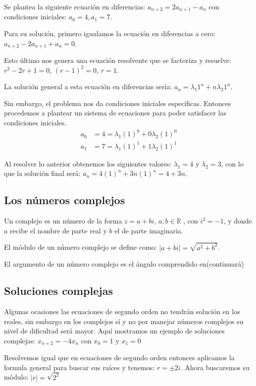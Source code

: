 \documentclass{article}
\begin{document}
Se plantea la siguiente ecuación en diferencias:
$a_{n+2}=2a_{n+1}-a_{n}$ con condiciones iniciales: $a_{0}=4, a_{1}=7$.

Para su solución, primero igualamos la ecuación en diferencias a
cero: $a_{n+2}-2a_{n+1}+a_{n}=0$.

Esto último nos genera una ecuación resolvente que se factoriza y
resuelve: $r^2-2r+1=0$, ${(r-1)^2=0}$, ${r=1}$.

La solución general a esta ecuación en diferencias sería:
$a_{n}=\lambda_{1}1^n+n\lambda_{2}1^n$.

Sin embargo, el problema nos da condiciones iniciales
específicas. Entonces procedemos a plantear un sistema de ecuaciones
para poder satisfacer las condiciones iniciales.
\begin{align*}
  \label{sistema2}
  a_{0}&=4=\lambda_{1}(1)^0+0\lambda_{2}(1)^0\\
  a_{1}&=7=\lambda_{1}(1)^1+1\lambda_{2}(1)^1
\end{align*}

Al resolver lo anterior obtenemos los siguientes valores:
$\lambda_{1}=4$ y $\lambda_{2}=3$, con lo que la solución final será:
$a_{n}=4(1)^n+3n(1)^n=4+3n$.


\subsection{Los números  complejos}

Un complejo es un número de la forma $z=a+bi$, $a,b\in\mathbb{R}$ ,
con $i^2=-1$, y donde $a$ recibe el nombre de parte real y $b$ el de
parte imaginaria.

El módulo de un número complejo se define como: $|a+bi|=\sqrt{a^2+b^2}$.

El argumento de un número complejo es el ángulo comprendido en(continuará)


\subsection{Soluciones complejas}
\label{sec:complejas}

Algunas ocasiones las ecuaciones de segundo orden no tendrán solución
en los reales, sin embargo en los complejos sí y no por manejar
números complejos su nivel de dificultad será mayor. Aquí mostramos un
ejemplo de soluciones complejas: $x_{n+2}=-4x_{n}$ con $x_0=1$ y
$x_1=0$

Resolvemos igual que en ecuaciones de segundo orden entonces aplicamos
la formula general para buscar sus raíces y tenemos: $r=\pm2i$.
Ahora buscaremos su módulo: $|r|=\sqrt{2^2}$
\end{document}

